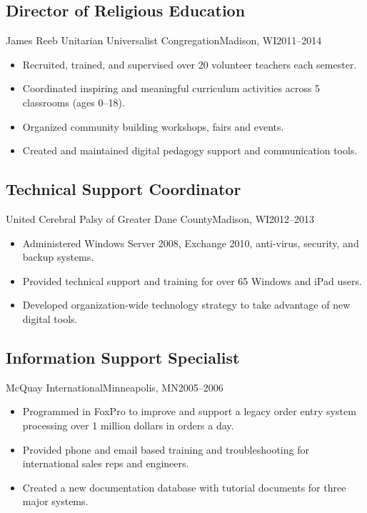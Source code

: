 \documentclass[../main.tex]{subfiles}
\begin{document}
	\subsection{Director of Religious Education}{James Reeb Unitarian Universalist Congregation}{Madison, WI}{2011--2014}
	\begin{itemize}
		\item{Recruited, trained, and supervised over 20 volunteer teachers each semester.}
		\item{Coordinated inspiring and meaningful curriculum activities across 5 classrooms (ages 0--18).}
		\item{Organized community building workshops, fairs and events.}
		\item{Created and maintained digital pedagogy support and communication tools.}
	\end{itemize}


	\subsection{Technical Support Coordinator}{United Cerebral Palsy of Greater Dane County}{Madison, WI}{2012--2013}
	\begin{itemize}
		\item{Administered Windows Server 2008, Exchange 2010, anti-virus, security, and backup systems.}
		\item{Provided technical support and training for over 65 Windows and iPad users.}
		\item{Developed organization-wide technology strategy to take advantage of new digital tools.}
	\end{itemize}


\subsection{Information Support Specialist}{McQuay International}{Minneapolis, MN}{2005--2006}
	\begin{itemize}
		\item{Programmed in FoxPro to improve and support a legacy order entry system processing over 1 million dollars in orders a day.}
		\item{Provided phone and email based training and troubleshooting for international sales reps and engineers.}
		\item{Created a new documentation database with tutorial documents for three major systems.}
	\end{itemize}
\end{document}
